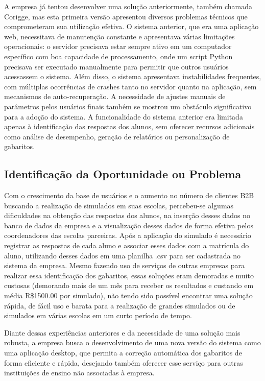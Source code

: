 \documentclass[12pt]{article}
\begin{document}
A empresa já tentou desenvolver uma solução anteriormente, também chamada Corigge, mas esta primeira versão apresentou diversos problemas técnicos que comprometeram sua utilização efetiva. O sistema anterior, que era uma aplicação web, necessitava de manutenção constante e apresentava várias limitações operacionais: o servidor precisava estar sempre ativo em um computador específico com boa capacidade de processamento, onde um script Python precisava ser executado manualmente para permitir que outros usuários acessassem o sistema. Além disso, o sistema apresentava instabilidades frequentes, com múltiplas ocorrências de crashes tanto no servidor quanto na aplicação, sem mecanismos de auto-recuperação. A necessidade de ajustes manuais de parâmetros pelos usuários finais também se mostrou um obstáculo significativo para a adoção do sistema. A funcionalidade do sistema anterior era limitada apenas à identificação das respostas dos alunos, sem oferecer recursos adicionais como análise de desempenho, geração de relatórios ou personalização de gabaritos.


\subsection{Identificação da Oportunidade ou Problema}
Com o crescimento da base de usuários e o aumento no número de clientes B2B buscando a realização de simulados em suas escolas, percebeu-se algumas dificuldades na obtenção das respostas dos alunos, na inserção desses dados no banco de dados da empresa e a visualização desses dados de forma efetiva pelos coordenadores das escolas parceiras. Após a aplicação do simulado é necessário registrar as respostas de cada aluno e associar esses dados com a matrícula do aluno, utilizando desses dados em uma planilha .csv para ser cadastrada no sistema da empresa. Mesmo fazendo uso de serviços de outras empresas para realizar essa identificação dos gabaritos, essas soluções eram demoradas e muito custosas (demorando mais de um mês para receber os resultados e custando em média R\$1500.00 por simulado), não tendo sido possível encontrar uma solução rápida, de fácil uso e barata para a realização de grandes simulados ou de simulados em várias escolas em um curto período de tempo. 

Diante dessas experiências anteriores e da necessidade de uma solução mais robusta, a empresa busca o desenvolvimento de uma nova versão do sistema como uma aplicação desktop, que permita a correção automática dos gabaritos de forma eficiente e rápida, desejando também oferecer esse serviço para outras instituições de ensino não associadas à empresa.
\end{document}
